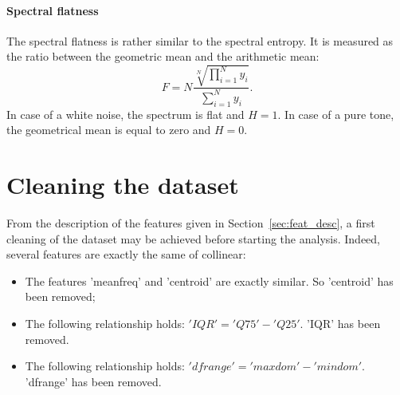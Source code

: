 \paragraph{Spectral flatness}
The spectral flatness is rather similar to the spectral entropy. It is measured as the ratio between the geometric mean and the arithmetic mean:
\begin{equation}
\label{eq:spec_flat}
	F = N \frac{\sqrt[N]{\prod\limits_{i=1}^{N} y_i}}{\sum \limits_{i=1}^{N} y_i}.
\end{equation}
In case of a white noise, the spectrum is flat and $H=1$. In case of a pure tone, the geometrical mean is equal to zero and $H=0$.

\section{Cleaning the dataset}
\label{sec_cleaning_dataset}
From the description of the features given in Section~\ref{sec:feat_desc}, a first cleaning of the dataset may be achieved before starting the analysis.
Indeed, several features are exactly the same of collinear:
\begin{itemize}
	\item The features 'meanfreq' and 'centroid' are exactly similar. So 'centroid' has been removed;
	\item The following relationship holds: $ 'IQR' = 'Q75' - 'Q25'$. 'IQR' has been removed.
	\item The following relationship holds: $ 'dfrange' = 'maxdom' - 'mindom'$. 'dfrange' has been removed.
\end{itemize}
%
%
